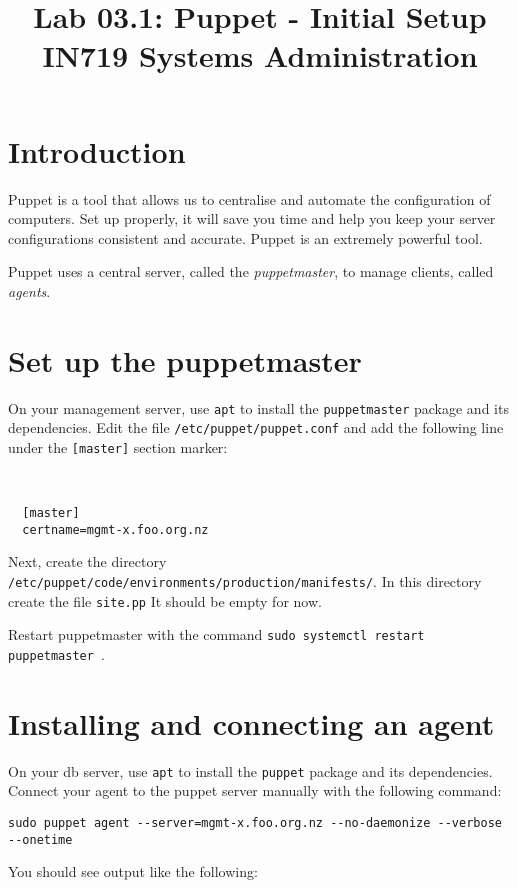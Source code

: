 \documentclass{article}
\begin{document}
\title{Lab 03.1: Puppet - Initial Setup \\ IN719 Systems Administration}
\date{}
\maketitle

\section*{Introduction}
Puppet is a tool that allows us to centralise and automate the configuration of computers.  Set up properly, it will save you time and help you keep your server configurations consistent and accurate.  Puppet is an extremely powerful tool.

Puppet uses a central server, called the \emph{puppetmaster}, to manage clients, called \emph{agents}.

\section{Set up the puppetmaster}
On your management server, use \texttt{apt} to install the \texttt{puppetmaster} package and its dependencies.  Edit the file \texttt{/etc/puppet/puppet.conf} and add the following line under the \texttt{[master]} section marker:

\
\begin{verbatim}
  [master]
  certname=mgmt-x.foo.org.nz
\end{verbatim}

Next, create the directory \texttt{/etc/puppet/code/environments/production/manifests/}.  In this directory create the file \texttt{site.pp} It should be empty for now.

Restart puppetmaster with the command \texttt{sudo systemctl restart puppetmaster }.

\section{Installing and connecting an agent}
On your db server, use \texttt{apt} to install the \texttt{puppet} package and its dependencies.  Connect your agent to the puppet server manually with the following command:

\begin{verbatim}
sudo puppet agent --server=mgmt-x.foo.org.nz --no-daemonize --verbose --onetime
\end{verbatim}

You should see output like the following:
\end{document}
